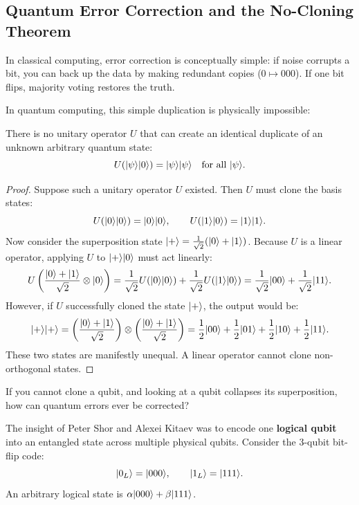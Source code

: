 \subsection{Quantum Error Correction and the No-Cloning Theorem}

In classical computing, error correction is conceptually simple: if noise corrupts a
bit, you can back up the data by making redundant copies ($0 \mapsto 000$). If one bit
flips, majority voting restores the truth.

In quantum computing, this simple duplication is physically impossible:

\begin{theorem}
There is no unitary operator $U$ that can create an identical duplicate of an
unknown arbitrary quantum state:
\[
  U(\lvert \psi \rangle\lvert 0 \rangle) = \lvert \psi \rangle\lvert \psi \rangle \quad \text{for all } \lvert \psi \rangle.
\]
\end{theorem}

\begin{proof}
Suppose such a unitary operator $U$ existed. Then $U$ must clone the basis states:
\[
  U(\lvert 0 \rangle\lvert 0 \rangle) = \lvert 0 \rangle\lvert 0 \rangle, \qquad U(\lvert 1 \rangle\lvert 0 \rangle) = \lvert 1 \rangle\lvert 1 \rangle.
\]
Now consider the superposition state $\lvert + \rangle = \frac{1}{\sqrt{2}}(\lvert 0 \rangle + \lvert 1 \rangle)$.
Because $U$ is a linear operator, applying $U$ to $\lvert + \rangle\lvert 0 \rangle$ must act linearly:
\[
  U\left(\frac{\lvert 0 \rangle + \lvert 1 \rangle}{\sqrt{2}} \otimes \lvert 0 \rangle\right)
  = \frac{1}{\sqrt{2}}U(\lvert 0 \rangle\lvert 0 \rangle) + \frac{1}{\sqrt{2}}U(\lvert 1 \rangle\lvert 0 \rangle)
  = \frac{1}{\sqrt{2}}\lvert 00 \rangle + \frac{1}{\sqrt{2}}\lvert 11 \rangle.
\]
However, if $U$ successfully cloned the state $\lvert + \rangle$, the output would be:
\[
  \lvert + \rangle\lvert + \rangle = \left(\frac{\lvert 0 \rangle + \lvert 1 \rangle}{\sqrt{2}}\right) \otimes \left(\frac{\lvert 0 \rangle + \lvert 1 \rangle}{\sqrt{2}}\right)
  = \frac{1}{2}\lvert 00 \rangle + \frac{1}{2}\lvert 01 \rangle + \frac{1}{2}\lvert 10 \rangle + \frac{1}{2}\lvert 11 \rangle.
\]
These two states are manifestly unequal. A linear operator cannot clone non-orthogonal states.
\end{proof}

If you cannot clone a qubit, and looking at a qubit collapses its superposition, how
can quantum errors ever be corrected?

The insight of Peter Shor and Alexei Kitaev was to encode one \textbf{logical qubit}
into an entangled state across multiple physical qubits. Consider the 3-qubit
bit-flip code:
\[
  \lvert 0_L \rangle = \lvert 000 \rangle, \qquad \lvert 1_L \rangle = \lvert 111 \rangle.
\]
An arbitrary logical state is $\alpha\lvert 000 \rangle + \beta\lvert 111 \rangle$.

